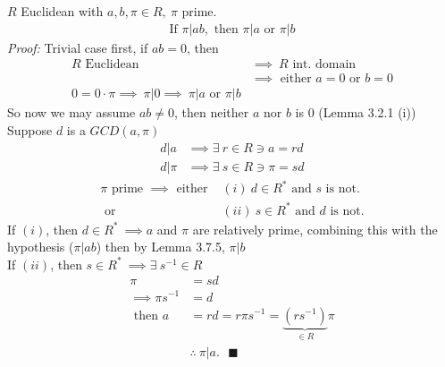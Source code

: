 \begin{lemma}
    $R$ Euclidean with $a,b, \pi \in R, \ \pi \text{ prime}$.
    \begin{align*}
        \text{If }\pi | ab, \text{ then }\pi|a \text{ or }\pi|b
    \end{align*}
    \textit{Proof: } Trivial case first, if $ab=0$, then
    \begin{align*}
        R \text{ Euclidean }&\implies \ R \text{ int. domain} \\
        &\implies \text{ either }a=0 \text{ or }b=0 \\
        0=0\cdot \pi \implies \ \pi | 0 \implies \ \pi | a \text{ or } \pi | b
    \end{align*}
    So now we may assume $ab\neq 0$, then neither $a$ nor $b$ is $0$ (Lemma 3.2.1 (i))\\
    Suppose $d$ is a $GCD(a,\pi)$
    \begin{align*}
        d|a &\implies \exists \ r\in R \ni a =rd \\
        d|\pi &\implies \exists \ s\in R \ni \pi = sd
    \end{align*}
    \begin{align*}
        \pi \text{ prime }\implies \text{ either } &(i) \ d\in R^* \text{ and }s \text{ is not.} \\
        \text{ or }&(ii) \ s\in R^* \text{ and }d \text{ is not.}
    \end{align*}
    If $(i)$, then $d\in R^* \ \implies a$ and $\pi$ are relatively prime, combining this with the
    hypothesis ($\pi|ab$) then by Lemma 3.7.5, $\pi|b$ \\

    \noindent If $(ii)$, then $s\in R^* \ \implies \exists \ s^{-1}\in R $
    \begin{align*}
        \pi &= sd \\
        \implies \pi s^{-1} &= d \\
        \text{ then }a&= rd =r\pi s^{-1}= \underbrace{(rs^{-1})}_{\in R}\pi \\
        &\therefore \ \pi | a. \ \ \ \blacksquare
    \end{align*}
\end{lemma}
\setcounter{dummy_lemma}{5}
